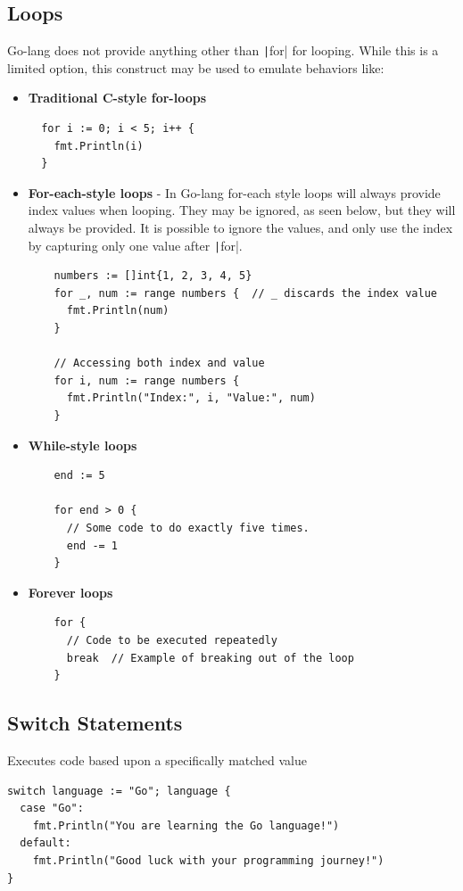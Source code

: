 \documentclass[letterpaper,12pt]{article}
\begin{document}
\subsection{Loops}
Go-lang does not provide anything other than \texttt|for| for looping. While this is a limited option, this construct may be used to emulate behaviors like:
\begin{itemize}
  \item \textbf{Traditional C-style for-loops}
  \begin{verbatim}
  for i := 0; i < 5; i++ {
    fmt.Println(i)
  }
  \end{verbatim}
  \item \textbf{For-each-style loops} - 
  In Go-lang for-each style loops will always provide index values when looping. They may be ignored, as seen below, but they will always be provided. It is possible to ignore the values, and only use the index by capturing only one value after \texttt|for|.
  \begin{verbatim}
    numbers := []int{1, 2, 3, 4, 5}
    for _, num := range numbers {  // _ discards the index value
      fmt.Println(num)
    }

    // Accessing both index and value
    for i, num := range numbers {
      fmt.Println("Index:", i, "Value:", num)
    }
  \end{verbatim}
  \item \textbf{While-style loops}
  \begin{verbatim}
    end := 5

    for end > 0 {
      // Some code to do exactly five times.
      end -= 1
    }
  \end{verbatim}
  \item \textbf{Forever loops}
  \begin{verbatim}
    for {
      // Code to be executed repeatedly
      break  // Example of breaking out of the loop
    }
  \end{verbatim}
\end{itemize}
\subsection{Switch Statements}
Executes code based upon a specifically matched value
\begin{verbatim}
switch language := "Go"; language {
  case "Go":
    fmt.Println("You are learning the Go language!")
  default:
    fmt.Println("Good luck with your programming journey!")
}
\end{verbatim}
\end{document}
